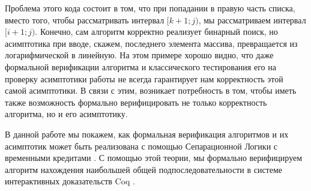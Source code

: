 Проблема этого кода состоит в том, что при попадании в правую часть списка, вместо того, чтобы рассматривать интервал $[k+1;j)$, мы
рассматриваем интервал \\
$[i+1;j)$. Конечно, сам алгоритм корректно реализует бинарный поиск, но асимптотика при вводе, скажем,
последнего элемента массива, превращается из логарифмической в линейную. На этом примере хорошо видно, что даже формальной верификации
алгоритма и классического тестирования его на проверку асимптотики работы не всегда гарантирует нам корректность этой самой асимптотики.
В связи с этим, возникает потребность в том, чтобы иметь также возможность формально верифицировать не только корректность алгоритма, но
и его асимптотику.
\par
В данной работе мы покажем, как формальная верификация алгоритмов и их асимптотик может быть реализована с помощью Сепарационной Логики
с временными кредитами \cite{base_article}. С помощью этой теории, мы формально верифицируем алгоритм нахождения наибольшей общей подпоследовательности
в системе интерактивных доказательств Coq \cite{the_coq_development_team_2021_4501022}.